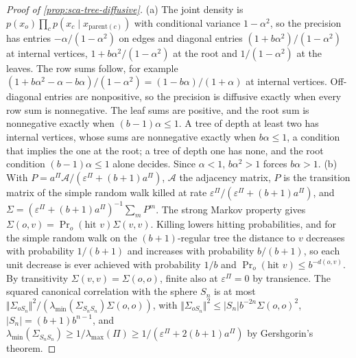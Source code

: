 \begin{proof}[Proof of \cref{prop:sca-tree-diffusive}]
(a) The joint density is $p(x_o)\prod_cp(x_c\mid x_{\mathrm{parent}(c)})$ with conditional variance $1-\alpha^2$, so the precision has entries $-\alpha/(1-\alpha^2)$ on edges and diagonal entries $(1+b\alpha^2)/(1-\alpha^2)$ at internal vertices, $1+b\alpha^2/(1-\alpha^2)$ at the root and $1/(1-\alpha^2)$ at the leaves. The row sums follow, for example $(1+b\alpha^2-\alpha-b\alpha)/(1-\alpha^2)=(1-b\alpha)/(1+\alpha)$ at internal vertices. Off-diagonal entries are nonpositive, so the precision is diffusive exactly when every row sum is nonnegative. The leaf sums are positive, and the root sum is nonnegative exactly when $(b-1)\alpha\le1$. A tree of depth at least two has internal vertices, whose sums are nonnegative exactly when $b\alpha\le1$, a condition that implies the one at the root; a tree of depth one has none, and the root condition $(b-1)\alpha\le1$ alone decides. Since $\alpha<1$, $b\alpha^2>1$ forces $b\alpha>1$. (b) With $P=a^\Pi\mathcal A/(\varepsilon^\Pi+(b+1)a^\Pi)$, $\mathcal A$ the adjacency matrix, $P$ is the transition matrix of the simple random walk killed at rate $\varepsilon^\Pi/(\varepsilon^\Pi+(b+1)a^\Pi)$, and $\Sigma=(\varepsilon^\Pi+(b+1)a^\Pi)^{-1}\sum_mP^m$. The strong Markov property gives $\Sigma(o,v)=\Pr_o(\text{hit }v)\Sigma(v,v)$. Killing lowers hitting probabilities, and for the simple random walk on the $(b+1)$-regular tree the distance to $v$ decreases with probability $1/(b+1)$ and increases with probability $b/(b+1)$, so each unit decrease is ever achieved with probability $1/b$ and $\Pr_o(\text{hit }v)\le b^{-d(o,v)}$. By transitivity $\Sigma(v,v)=\Sigma(o,o)$, finite also at $\varepsilon^\Pi=0$ by transience. The squared canonical correlation with the sphere $S_n$ is at most $\Vert\Sigma_{oS_n}\Vert^2/(\lambda_{\min}(\Sigma_{S_nS_n})\Sigma(o,o))$, with $\Vert\Sigma_{oS_n}\Vert^2\le|S_n|b^{-2n}\Sigma(o,o)^2$, $|S_n|=(b+1)b^{n-1}$, and $\lambda_{\min}(\Sigma_{S_nS_n})\ge1/\lambda_{\max}(\Pi)\ge1/(\varepsilon^\Pi+2(b+1)a^\Pi)$ by Gershgorin's theorem.
\end{proof}

